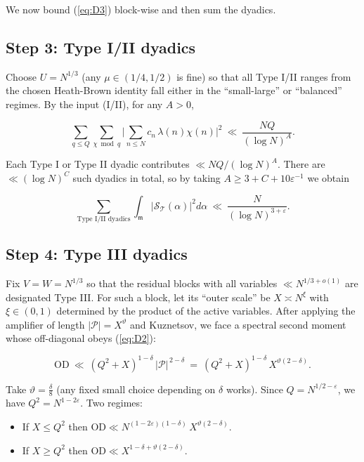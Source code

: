 \documentclass[11pt]{article}
\def\eqref#1{(\ref{#1})}%
\theoremstyle{definition}
\theoremstyle{remark}
\numberwithin{equation}{part}
\begin{document}
We now bound \eqref{eq:D3} block-wise and then sum the dyadics.


\subsection{Step 3: Type I/II dyadics}
Choose $U=N^{1/3}$ (any $\mu\in(1/4,1/2)$ is fine) so that all Type I/II ranges from the chosen Heath-Brown identity fall either in the “small-large” or “balanced” regimes. By the input (I/II), for any $A>0$,

$$
	\sum_{q\le Q}\sum_{\chi\bmod q}
	\Big|\sum_{n\le N} c_n\,\lambda(n)\chi(n)\Big|^2
	\ \ll\ \frac{NQ}{(\log N)^A}.
$$

Each Type I or Type II dyadic contributes $\ll NQ/(\log N)^A$. There are $\ll(\log N)^C$ such dyadics in total, so by taking $A\ge 3+C+10\varepsilon^{-1}$ we obtain

\begin{equation}\label{eq:D5}
	\sum_{\text{Type I/II dyadics}}
	\int_{\mathfrak m}\big|\mathcal S_{\mathcal T}(\alpha)\big|^2 d\alpha
	\ \ll\ \frac{N}{(\log N)^{3+\varepsilon}}.
\end{equation}

\subsection{Step 4: Type III dyadics}
Fix $V=W=N^{1/3}$ so that the residual blocks with all variables $\ll N^{1/3+o(1)}$ are designated Type III. For such a block, let its “outer scale” be $X\asymp N^\xi$ with $\xi\in(0,1)$ determined by the product of the active variables. After applying the amplifier of length $|\mathcal P|=X^\vartheta$ and Kuznetsov, we face a spectral second moment whose off-diagonal obeys \eqref{eq:D2}:

$$
	\mathrm{OD}\ \ll\ (Q^2+X)^{1-\delta}\,|\mathcal P|^{\,2-\delta}
	\ =\ (Q^2+X)^{1-\delta}\,X^{\vartheta(2-\delta)}.
$$

Take $\vartheta=\tfrac{\delta}{8}$ (any fixed small choice depending on $\delta$ works). Since $Q=N^{1/2-\varepsilon}$, we have $Q^2=N^{1-2\varepsilon}$. Two regimes:

\begin{itemize}
	\item If $X\le Q^2$ then $\mathrm{OD}\ll N^{(1-2\varepsilon)(1-\delta)}\,X^{\vartheta(2-\delta)}$.
	\item If $X\ge Q^2$ then $\mathrm{OD}\ll X^{1-\delta+\vartheta(2-\delta)}$.
\end{itemize}
\end{document}
